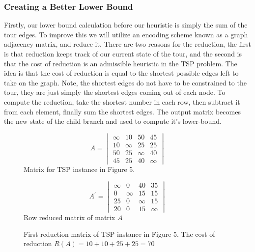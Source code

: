     \subsubsection{Creating a Better Lower Bound}
    Firstly, our lower bound calculation before our heuristic is simply the sum 
    of the tour edges. To improve this we will utilize an encoding scheme known as 
    a graph adjacency matrix, and reduce it. There are two reasons for the reduction, 
    the first is that reduction keeps track of our current state of the tour, and the second
    is that the cost of reduction is an admissible heuristic in the TSP problem.
    The idea is that the cost of reduction is equal to the shortest possible edges left to
    take on the graph. Note, the shortest edges do not have to be constrained to the tour, they
    are just simply the shortest edges coming out of each node. To compute the reduction, take the
    shortest number in each row, then subtract it from each element, finally sum the shortest edges.
    The output matrix becomes the new state of the child branch and used to compute it's lower-bound.\\
    
    \begin{figure}
        \begin{minipage}{.5\linewidth}
          \centering
          \begin{equation*}
            A = 
            \begin{vmatrix}
                \infty & 10 & 50 & 45\\
                10 & \infty & 25 & 25 \\
                50 & 25 & \infty & 40 \\
                45 & 25 & 40 & \infty
	        \end{vmatrix}
          \end{equation*}
          Matrix for TSP instance in Figure 5.
        \end{minipage}%
        \begin{minipage}{.5\linewidth}
          \centering
          \begin{equation*}
            A^{'} = 
                \begin{vmatrix}
                    \infty & 0 & 40 & 35\\
                    0 & \infty & 15 & 15 \\
                    25 & 0 & \infty & 15 \\
                    20 & 0 & 15 & \infty
                \end{vmatrix}
            \end{equation*}
          Row reduced matrix of matrix $A$\\
        \end{minipage}
        \caption{First reduction matrix of TSP instance in Figure 5.
                The cost of reduction $ R(A) = 10 + 10 + 25 + 25 = 70$}
      \end{figure}
      

